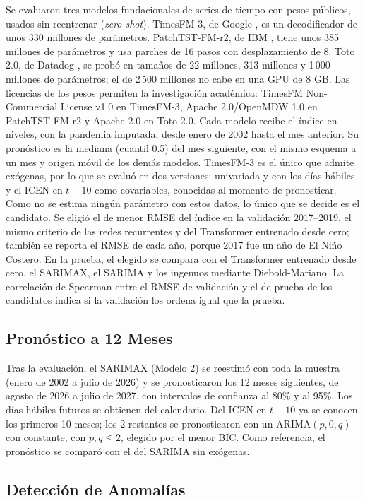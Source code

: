 \documentclass[conference]{IEEEtran}
\begin{document}
Se evaluaron tres modelos fundacionales de series de tiempo con pesos públicos, usados sin reentrenar (\textit{zero-shot}). TimesFM-3, de Google \cite{das2024,timesfm3}, es un decodificador de unos 330 millones de parámetros. PatchTST-FM-r2, de IBM \cite{nie2023,patchtstfm}, tiene unos 385 millones de parámetros y usa parches de 16 pasos con desplazamiento de 8. Toto 2.0, de Datadog \cite{toto2026}, se probó en tamaños de 22 millones, 313 millones y 1\,000 millones de parámetros; el de 2\,500 millones no cabe en una GPU de 8 GB. Las licencias de los pesos permiten la investigación académica: TimesFM Non-Commercial License v1.0 en TimesFM-3, Apache 2.0/OpenMDW 1.0 en PatchTST-FM-r2 y Apache 2.0 en Toto 2.0. Cada modelo recibe el índice en niveles, con la pandemia imputada, desde enero de 2002 hasta el mes anterior. Su pronóstico es la mediana (cuantil 0.5) del mes siguiente, con el mismo esquema a un mes y origen móvil de los demás modelos. TimesFM-3 es el único que admite exógenas, por lo que se evaluó en dos versiones: univariada y con los días hábiles y el ICEN en $t-10$ como covariables, conocidas al momento de pronosticar. Como no se estima ningún parámetro con estos datos, lo único que se decide es el candidato. Se eligió el de menor RMSE del índice en la validación 2017--2019, el mismo criterio de las redes recurrentes y del Transformer entrenado desde cero; también se reporta el RMSE de cada año, porque 2017 fue un año de El Niño Costero. En la prueba, el elegido se compara con el Transformer entrenado desde cero, el SARIMAX, el SARIMA y los ingenuos mediante Diebold-Mariano. La correlación de Spearman entre el RMSE de validación y el de prueba de los candidatos indica si la validación los ordena igual que la prueba.

\subsection{Pronóstico a 12 Meses}

Tras la evaluación, el SARIMAX (Modelo 2) se reestimó con toda la muestra (enero de 2002 a julio de 2026) y se pronosticaron los 12 meses siguientes, de agosto de 2026 a julio de 2027, con intervalos de confianza al 80\% y al 95\%. Los días hábiles futuros se obtienen del calendario. Del ICEN en $t-10$ ya se conocen los primeros 10 meses; los 2 restantes se pronosticaron con un ARIMA$(p,0,q)$ con constante, con $p,q\leq2$, elegido por el menor BIC. Como referencia, el pronóstico se comparó con el del SARIMA sin exógenas.

\subsection{Detección de Anomalías}
\end{document}
